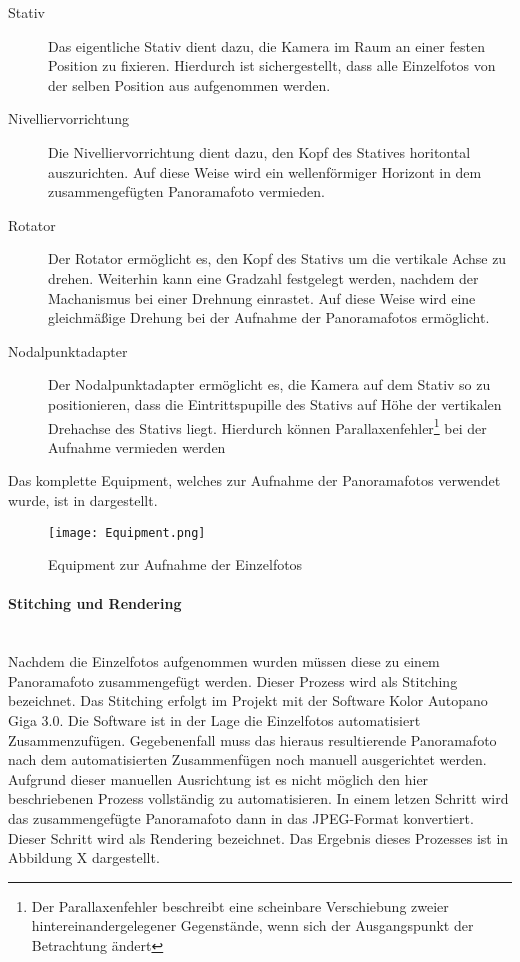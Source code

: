 \begin{description}
\item[Stativ] Das eigentliche Stativ dient dazu, die Kamera im Raum an einer
festen Position zu fixieren. Hierdurch ist sichergestellt, dass alle
Einzelfotos von der selben Position aus aufgenommen werden.
\item[Nivelliervorrichtung] Die Nivelliervorrichtung dient dazu, den Kopf des
Statives horitontal auszurichten. Auf diese Weise wird ein wellenförmiger
Horizont in dem zusammengefügten Panoramafoto vermieden.
\item[Rotator] Der Rotator ermöglicht es, den Kopf des Stativs um die vertikale
Achse zu drehen. Weiterhin kann eine Gradzahl festgelegt werden, nachdem der
Machanismus bei einer Drehnung einrastet. Auf diese Weise wird eine gleichmäßige
Drehung bei der Aufnahme der Panoramafotos ermöglicht.
\item[Nodalpunktadapter] Der Nodalpunktadapter ermöglicht es, die Kamera auf
dem Stativ so zu positionieren, dass die Eintrittspupille des Stativs auf Höhe
der vertikalen Drehachse des Stativs liegt. Hierdurch können
Parallaxenfehler\footnote{Der Parallaxenfehler beschreibt eine scheinbare
Verschiebung zweier hintereinandergelegener Gegenstände, wenn sich der
Ausgangspunkt der Betrachtung ändert} bei der Aufnahme vermieden werden
\end{description}

Das komplette Equipment, welches zur Aufnahme der Panoramafotos verwendet wurde,
ist in  dargestellt.

\begin{figure}[htb]
\centering
\texttt{[image: Equipment.png]}
\caption[Equipment zur Aufnahme der Einzelfotos]{Equipment zur Aufnahme der Einzelfotos\protect\footnotemark}
\label{fig:Equipment}
\end{figure}

\paragraph{Stitching und Rendering} \hfill \\

Nachdem die Einzelfotos aufgenommen wurden müssen diese zu einem Panoramafoto
zusammengefügt werden. Dieser Prozess wird als Stitching bezeichnet. Das
Stitching erfolgt im Projekt mit der Software Kolor Autopano Giga 3.0. Die
Software ist in der Lage die Einzelfotos automatisiert Zusammenzufügen.
Gegebenenfall muss das hieraus resultierende Panoramafoto nach dem
automatisierten Zusammenfügen noch manuell ausgerichtet werden. Aufgrund
dieser manuellen Ausrichtung ist es nicht möglich den hier beschriebenen
Prozess vollständig zu automatisieren. In einem letzen Schritt wird das
zusammengefügte Panoramafoto dann in das JPEG-Format konvertiert. Dieser Schritt
wird als Rendering bezeichnet. Das Ergebnis dieses Prozesses ist in Abbildung X
dargestellt.

